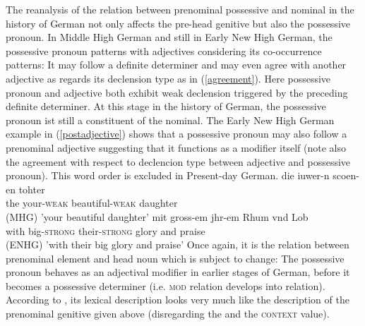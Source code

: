 \documentclass[output=paper]{langsci/langscibook}
\begin{document}
The reanalysis of the relation between prenominal possessive and nominal in the history of German not only affects the pre-head genitive but also the possessive pronoun. In Middle High German and still in Early New High German, the possessive pronoun patterns with adjectives considering its co-occurrence patterns: It may follow a definite determiner and may even agree with another adjective as regards its declension type as in (\ref{agreement}). Here possessive pronoun and adjective both exhibit weak declension triggered by the preceding definite determiner. At this stage in the history of German, the possessive pronoun ist still a constituent of the nominal. The Early New High German example in (\ref{postadjective}) shows that a possessive pronoun may also follow a prenominal adjective suggesting that it functions as a modifier itself (note also the agreement with respect to declencion type between adjective and possessive pronoun). This word order is excluded in Present-day German.
\eal
\ex \label{agreement}
\gll  die iuwer-n scoen-en tohter \\ the your-\textsc{weak} beautiful-\textsc{weak} daughter  \\ \hfill (MHG)
\glt 'your beautiful daughter'
\ex \label{postadjective}
\gll mit gross-em jhr-em Rhum vnd Lob \\ with big-\textsc{strong} their-\textsc{strong} glory and praise   \\ \hfill (ENHG)
\glt 'with their big glory and praise'
\zl
Once again, it is the relation between prenominal element and head noun which is subject to change: The possessive pronoun behaves as an adjectival modifier in earlier stages of German, before it becomes a possessive determiner (i.e. \textsc{mod} relation develops into \spr relation). According to \cite[54]{PoSa94}, its lexical description looks very much like the description of the prenominal genitive given above (disregarding the \content and the \textsc{context} value).
\end{document}
